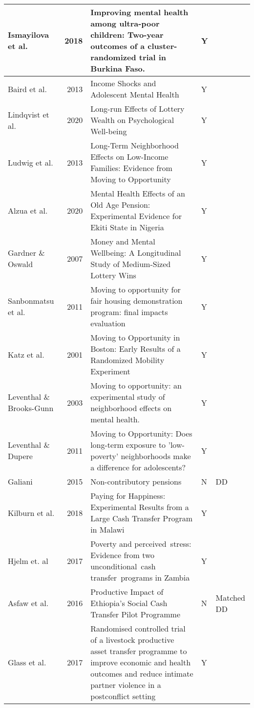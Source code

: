 \begin{table}[ht]
\begin{tabular}{lrlll}
   \hline
Ismayilova et al. & 2018 & Improving mental health among ultra-poor children: Two-year outcomes of a cluster-randomized trial in Burkina Faso. & Y &  \\ 
   \hline
Baird et al. & 2013 & Income Shocks and Adolescent Mental Health & Y &  \\ 
   \hline
Lindqvist et al. & 2020 & Long-run Effects of Lottery Wealth on Psychological Well-being & Y &  \\ 
   \hline
Ludwig et al. & 2013 & Long-Term Neighborhood Effects on Low-Income Families: Evidence from Moving to Opportunity & Y &  \\ 
   \hline
Alzua et al. & 2020 & Mental Health Effects of an Old Age Pension: Experimental Evidence for Ekiti State in Nigeria & Y &  \\ 
   \hline
Gardner \& Oswald & 2007 & Money and Mental Wellbeing: A Longitudinal Study of Medium-Sized Lottery Wins & Y &  \\ 
   \hline
Sanbonmatsu et al. & 2011 & Moving to opportunity for fair housing demonstration program: final impacts evaluation & Y &  \\ 
   \hline
Katz et al. & 2001 & Moving to Opportunity in Boston: Early Results of a Randomized Mobility Experiment & Y &  \\ 
   \hline
Leventhal \& Brooks-Gunn & 2003 & Moving to opportunity: an experimental study of neighborhood effects on mental health. & Y &  \\ 
   \hline
Leventhal \& Dupere & 2011 & Moving to Opportunity: Does long-term exposure to 'low-poverty' neighborhoods make a difference for adolescents? & Y &  \\ 
   \hline
Galiani & 2015 & Non-contributory pensions & N & DD \\ 
   \hline
Kilburn et al. & 2018 & Paying for Happiness: Experimental Results from a Large Cash Transfer Program in Malawi & Y &  \\ 
   \hline
Hjelm et. al & 2017 & Poverty and perceived stress: Evidence from two unconditional cash transfer programs in Zambia & Y &  \\ 
   \hline
Asfaw et al. & 2016 & Productive Impact of Ethiopia's Social Cash Transfer Pilot Programme & N & Matched DD \\ 
   \hline
Glass et al. & 2017 & Randomised controlled trial of a livestock productive asset transfer programme to improve economic and health outcomes and reduce intimate partner violence in a postconflict setting & Y &  \\ 

\end{tabular}
\end{table}
